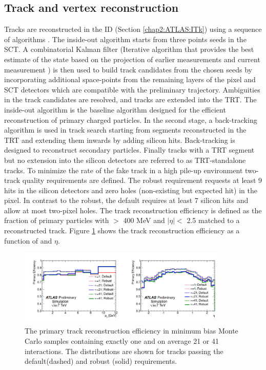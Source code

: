 \subsection{Track and vertex reconstruction}
\label{chap2:Objects:Trk}
Tracks are reconstructed in the ID (Section \ref{chap2:ATLAS:ITk}) using a sequence of algorithms \cite{Track_Reco, New_Trk}. The inside-out algorithm starts from three points seeds in the SCT. A combinatorial Kalman filter (Iterative algorithm that provides the best estimate of the state based on the projection of earlier measurements and current measurement \cite{Kalman}) is then used to build track candidates from the chosen seeds by incorporating additional space-points from the remaining layers of the pixel and SCT detectors which are compatible with the preliminary trajectory. Ambiguities in the track candidates are resolved, and tracks are extended into the TRT. The inside-out algorithm is the baseline algorithm designed for the efficient reconstruction of primary charged particles. In the second stage, a back-tracking algorithm is used in track search starting from segments reconstructed in the TRT and extending them inwards by adding silicon hits. Back-tracking is designed to reconstruct secondary particles. Finally tracks with a TRT segment but no extension into the silicon detectors are referred to as TRT-standalone tracks. To minimize the rate of the fake track in a high pile-up environment two-track quality requirements are defined. The robust requirement requests at least 9 hits in the silicon detectors and zero holes (non-existing but expected hit) in the pixel. In contrast to the robust, the default requires at least 7 silicon hits and allow at most two-pixel holes. The track reconstruction efficiency is defined as the fraction of primary particles with \pT $>$ 400 MeV and $|\eta|<$ 2.5 matched to a reconstructed track. Figure \ref{fig:chap2:Objects:Trk:Eff} shows the track reconstruction efficiency as a function of \pT and $\eta$.
\begin{figure}[htbp]
    \centering
    \includegraphics[width=0.9\textwidth]{Ch2/Img/Track_reco_eff.png}
    \caption{The primary track reconstruction efficiency in minimum bias Monte Carlo samples containing exactly one and on average 21 or 41 interactions. The distributions are shown for tracks passing the default(dashed) and robust (solid) requirements.}
    \label{fig:chap2:Objects:Trk:Eff}
\end{figure}
